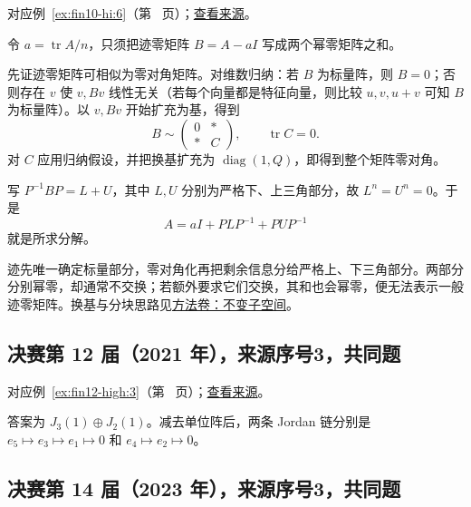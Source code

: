 \documentclass[UTF8,12pt,a4paper,fontset=fandol]{ctexart}
\begin{document}
对应例~\ref{ex:fin10-hi:6}（第~\pageref{ex:fin10-hi:6} 页）；\href{https://github.com/lzxcr/cmc-mathematics/blob/64916fa1fdbc3e444a652eca204d5669058ee321/src/problems/finals/10/06.md}{查看来源}。

\begin{solve}

令 $a=\operatorname{tr}A/n$，只须把迹零矩阵 $B=A-aI$ 写成两个幂零矩阵之和。

先证迹零矩阵可相似为零对角矩阵。对维数归纳：若 $B$ 为标量阵，则 $B=0$；否则存在 $v$ 使 $v,Bv$ 线性无关（若每个向量都是特征向量，则比较 $u,v,u+v$ 可知 $B$ 为标量阵）。以 $v,Bv$ 开始扩充为基，得到
\[
B\sim\begin{pmatrix}0&*\\ *&C\end{pmatrix},\qquad \operatorname{tr}C=0.
\]
对 $C$ 应用归纳假设，并把换基扩充为 $\operatorname{diag}(1,Q)$，即得到整个矩阵零对角。

写 $P^{-1}BP=L+U$，其中 $L,U$ 分别为严格下、上三角部分，故 $L^n=U^n=0$。于是
\[
A=aI+PLP^{-1}+PUP^{-1}
\]
就是所求分解。

\end{solve}

\begin{remark}[方法与条件]

迹先唯一确定标量部分，零对角化再把剩余信息分给严格上、下三角部分。两部分分别幂零，却通常不交换；若额外要求它们交换，其和也会幂零，便无法表示一般迹零矩阵。换基与分块思路见\hyperref[app:linear-invariant]{方法卷：不变子空间}。

\end{remark}

\subsection{决赛第 12 届（2021 年），来源序号3，共同题}\label{ans:fin12-high:3}\label{pr:fin12-high:3}

对应例~\ref{ex:fin12-high:3}（第~\pageref{ex:fin12-high:3} 页）；\href{https://github.com/lzxcr/cmc-mathematics/blob/64916fa1fdbc3e444a652eca204d5669058ee321/src/problems/finals/12/03.md}{查看来源}。

\begin{solve}

答案为 $J_3(1)\oplus J_2(1)$。减去单位阵后，两条 Jordan 链分别是 $e_5\mapsto e_3\mapsto e_1\mapsto0$ 和 $e_4\mapsto e_2\mapsto0$。

\end{solve}

\subsection{决赛第 14 届（2023 年），来源序号3，共同题}\label{ans:fin14-high:3}\label{pr:fin14-high:3}
\end{document}

